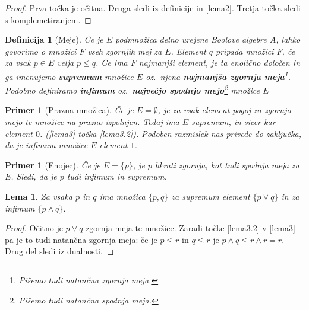 \documentclass{amsart}
\newtheorem{lema}[izrek]{Lema}
\newtheorem{definicija}[izrek]{Definicija}
\newtheorem{primer}[izrek]{Primer}
\begin{document}
\begin{proof}
    Prva točka je očitna. Druga sledi iz definicije in \ref{lema2}. Tretja točka sledi s komplemetiranjem.

\end{proof}

\begin{definicija}[Meje]
    Če je $E$ podmnožica delno urejene Boolove algebre \(A\), lahko govorimo o množici \(F\) vseh zgornjih mej za \(E\).
    Element \(q\) pripada množici \(F\), če za vsak \(p \in E\) velja \(p \leq q\). Če ima \(F\) najmanjši element, je ta 
    enolično določen in ga imenujemo {\bf supremum} množice \(E\) oz.~njena {\bf najmanjša zgornja meja}\footnote{Pišemo tudi natančna zgornja meja.}. Podobno 
    definiramo {\bf infimum} oz.~{\bf največjo spodnjo mejo}\footnote{Pišemo tudi natančna spodnja meja.} množice \(E\)
\end{definicija}

\begin{primer}[Prazna množica]
    \label{primer1}
    Če je \(E = \emptyset\), je za vsak element pogoj za zgornjo mejo te množice na prazno izpolnjen.
    Tedaj ima \(E\) supremum, in sicer kar element \(0\).
    (\ref{lema3} točka \ref{lema3.2}). 
    Podoben razmislek nas privede do zaključka, da je infimum množice \(E\) element \(1\).
\end{primer}

\begin{primer}[Enojec]
    \label{primer2}
    Če je \(E = \{p\}\), je $p$ hkrati zgornja, kot tudi spodnja meja za \(E\). Sledi, da je $p$ tudi infimum in supremum.
\end{primer}

\begin{lema}
    Za vsaka \(p\) in \(q\) ima množica \(\{p, q\}\) za supremum element \(\{p \vee q\}\) in za infimum \(\{p \wedge q\}\).
\end{lema}

\begin{proof}
    Očitno je \(p \vee q\) zgornja meja te množice. Zaradi točke \ref{lema3.2} v \ref{lema3} pa je to tudi natančna zgornja meja:
    če je $p \leq r$ in $q \leq r$ je $p \wedge q \leq r \wedge r = r$.
    Drug del sledi iz dualnosti.

\end{proof}
\end{document}
